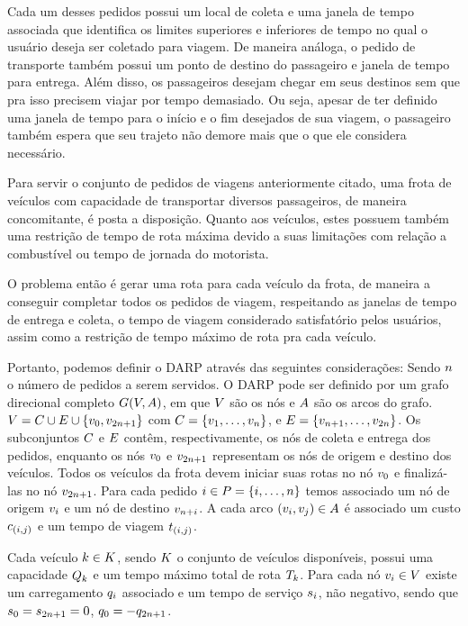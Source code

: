 Cada um desses pedidos possui um local de coleta e uma janela de
tempo associada que identifica os limites superiores e inferiores de tempo no 
qual o usuário deseja ser coletado para viagem.
De maneira análoga, o pedido de transporte também possui um ponto de destino do
passageiro e janela de tempo para entrega.
Além disso, os passageiros desejam chegar em seus destinos sem que pra isso
precisem viajar por tempo demasiado.
Ou seja, apesar de ter definido uma janela de tempo para o início e o fim
desejados de sua viagem, o passageiro também espera que seu trajeto não demore
mais que o que ele considera necessário.

Para servir o conjunto de pedidos de viagens anteriormente citado, uma frota de
veículos com capacidade de transportar diversos passageiros, de maneira
concomitante, é posta a disposição.
Quanto aos veículos, estes possuem também uma restrição de tempo de rota máxima
devido a suas limitações com relação a combustível ou tempo de jornada do
motorista.

O problema então é gerar uma rota para cada veículo da frota, de maneira a
conseguir completar todos os pedidos de viagem, respeitando as janelas de tempo
de entrega e coleta, o tempo de viagem considerado satisfatório
pelos usuários, assim como a restrição de tempo máximo de rota pra cada
veículo.

Portanto, podemos definir o DARP através das seguintes considerações:
Sendo $n$ o número de pedidos a serem servidos.
O DARP pode ser definido por um grafo direcional completo 
$G(V,A)$, em que $V$ são os nós e $A$ são os arcos do
grafo.  
$V = C \cup E \cup \{v_{0}, v_{2n + 1} \}$ com
$C = \{v_{1}, \ldots, v_{n}\}$, e 
$E = \{v_{n + 1}, \ldots,
v_{2n}\}$.
Os subconjuntos $C$ e $E$ contêm, respectivamente, 
os nós de coleta e entrega dos pedidos, enquanto os nós $v_{0}$ e 
$v_{2n + 1}$ representam os nós de origem e destino dos veículos.
Todos os veículos da frota devem iniciar suas rotas no nó $v_{0}$ e
finalizá-las no nó $v_{2n + 1}$.
Para cada pedido $i \in P = \{i, \ldots,
n\}$ temos associado um nó de origem $v_{i}$ e um 
nó de destino $v_{n + i}$.
A cada arco $(v_{i},v_{j}) \in A$ é associado um custo $c_{(i,j)}$ 
e um tempo de viagem $t_{(i,j)}$.

Cada veículo $k \in K$, sendo $K$ o conjunto de 
veículos disponíveis, possui uma capacidade $Q_{k}$ e um tempo 
máximo total de rota $T_k$.
Para cada nó $v_{i} \in V$ existe um carregamento $q_{i}$ 
associado e um tempo de serviço $s_{i}$, não negativo, sendo que 
$s_{0} = s_{2n + 1} = 0$, 
$q_{0} = -q_{2n + 1}$. 


